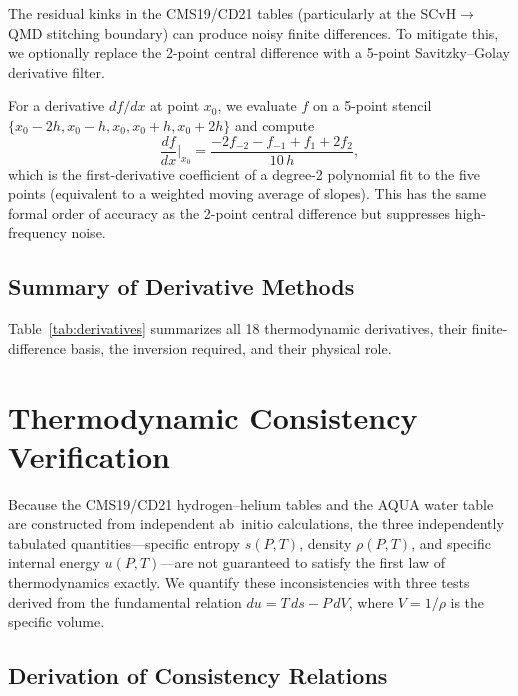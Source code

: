 \documentclass[twocolumn]{aastex701}
\begin{document}
The residual kinks in the CMS19/CD21 tables (particularly at the SCvH$\to$QMD stitching boundary) can produce noisy finite differences.
To mitigate this, we optionally replace the 2-point central difference with a 5-point Savitzky--Golay derivative filter.

For a derivative $df/dx$ at point $x_0$, we evaluate $f$ on a 5-point stencil $\{x_0 - 2h, x_0 - h, x_0, x_0 + h, x_0 + 2h\}$ and compute
\begin{equation}\label{eq:savgol}
    \frac{df}{dx}\bigg|_{x_0} = \frac{-2f_{-2} - f_{-1} + f_1 + 2f_2}{10\,h},
\end{equation}
which is the first-derivative coefficient of a degree-2 polynomial fit to the five points (equivalent to a weighted moving average of slopes).
This has the same formal order of accuracy as the 2-point central difference but suppresses high-frequency noise.

\subsection{Summary of Derivative Methods}

Table~\ref{tab:derivatives} summarizes all 18 thermodynamic derivatives, their finite-difference basis, the inversion required, and their physical role.



\section{Thermodynamic Consistency Verification}\label{sec:thermo_consistency}

Because the CMS19/CD21 hydrogen--helium tables and the AQUA water table are constructed from independent ab~initio calculations, the three independently tabulated quantities---specific entropy $s(P,T)$, density $\rho(P,T)$, and specific internal energy $u(P,T)$---are not guaranteed to satisfy the first law of thermodynamics exactly.
We quantify these inconsistencies with three tests derived from the fundamental relation $du = T\,ds - P\,dV$, where $V = 1/\rho$ is the specific volume.

\subsection{Derivation of Consistency Relations}
\end{document}
